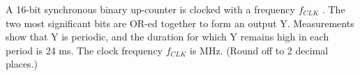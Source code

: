  A 16-bit synchronous binary up-counter is clocked with a frequency $f_{CLK}$ . The two most significant bits are OR-ed together to form an output Y. Measurements show that Y is periodic, and the duration for which Y remains high in each period is 24 ms. The clock frequency $f_{CLK}$ \underline{\hspace{1cm}} is  MHz. (Round off to 2 decimal places.)
